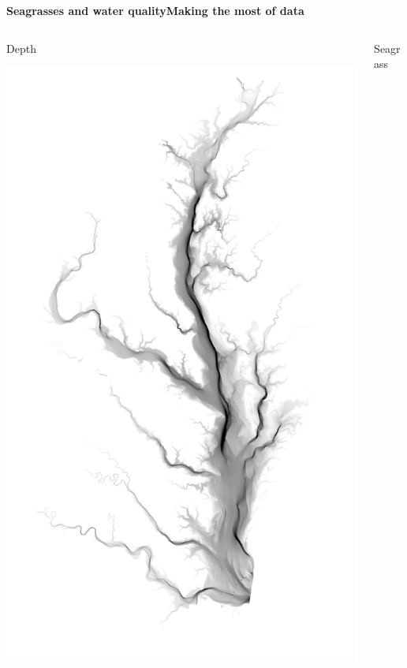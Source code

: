 \documentclass[serif]{beamer}\usepackage[]{graphicx}\usepackage[]{color}
\begin{document}
\begin{frame}{\textbf{Seagrasses and water quality}}{\textbf{Making the most of data}}
\begin{columns}
\begin{column}{0.3\textwidth}
Depth
\centerline{\includegraphics[width = \textwidth]{fig/cb_dem.png}}
\end{column}
\begin{column}{0.3\textwidth}
Seagrass

\end{column}
\end{columns}
\end{frame}
\end{document}
